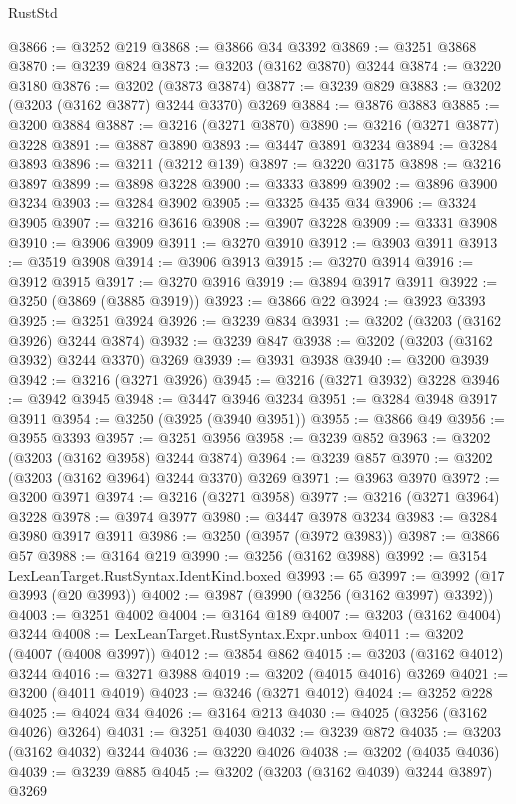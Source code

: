 \begin{lexlean}{RustStd}
\begin{coremodule}
@3866 := @3252 @219
@3868 := @3866 @34 @3392
@3869 := @3251 @3868
@3870 := @3239 @824
@3873 := @3203 (@3162 @3870) @3244
@3874 := @3220 @3180
@3876 := @3202 (@3873 @3874)
@3877 := @3239 @829
@3883 := @3202 (@3203 (@3162 @3877) @3244 @3370) @3269
@3884 := @3876 @3883
@3885 := @3200 @3884
@3887 := @3216 (@3271 @3870)
@3890 := @3216 (@3271 @3877) @3228
@3891 := @3887 @3890
@3893 := @3447 @3891 @3234
@3894 := @3284 @3893
@3896 := @3211 (@3212 @139)
@3897 := @3220 @3175
@3898 := @3216 @3897
@3899 := @3898 @3228
@3900 := @3333 @3899
@3902 := @3896 @3900 @3234
@3903 := @3284 @3902
@3905 := @3325 @435 @34
@3906 := @3324 @3905
@3907 := @3216 @3616
@3908 := @3907 @3228
@3909 := @3331 @3908
@3910 := @3906 @3909
@3911 := @3270 @3910
@3912 := @3903 @3911
@3913 := @3519 @3908
@3914 := @3906 @3913
@3915 := @3270 @3914
@3916 := @3912 @3915
@3917 := @3270 @3916
@3919 := @3894 @3917 @3911
@3922 := @3250 (@3869 (@3885 @3919))
@3923 := @3866 @22
@3924 := @3923 @3393
@3925 := @3251 @3924
@3926 := @3239 @834
@3931 := @3202 (@3203 (@3162 @3926) @3244 @3874)
@3932 := @3239 @847
@3938 := @3202 (@3203 (@3162 @3932) @3244 @3370) @3269
@3939 := @3931 @3938
@3940 := @3200 @3939
@3942 := @3216 (@3271 @3926)
@3945 := @3216 (@3271 @3932) @3228
@3946 := @3942 @3945
@3948 := @3447 @3946 @3234
@3951 := @3284 @3948 @3917 @3911
@3954 := @3250 (@3925 (@3940 @3951))
@3955 := @3866 @49
@3956 := @3955 @3393
@3957 := @3251 @3956
@3958 := @3239 @852
@3963 := @3202 (@3203 (@3162 @3958) @3244 @3874)
@3964 := @3239 @857
@3970 := @3202 (@3203 (@3162 @3964) @3244 @3370) @3269
@3971 := @3963 @3970
@3972 := @3200 @3971
@3974 := @3216 (@3271 @3958)
@3977 := @3216 (@3271 @3964) @3228
@3978 := @3974 @3977
@3980 := @3447 @3978 @3234
@3983 := @3284 @3980 @3917 @3911
@3986 := @3250 (@3957 (@3972 @3983))
@3987 := @3866 @57
@3988 := @3164 @219
@3990 := @3256 (@3162 @3988)
@3992 := @3154 LexLeanTarget.RustSyntax.IdentKind.boxed
@3993 := 65
@3997 := @3992 (@17 @3993 (@20 @3993))
@4002 := @3987 (@3990 (@3256 (@3162 @3997) @3392))
@4003 := @3251 @4002
@4004 := @3164 @189
@4007 := @3203 (@3162 @4004) @3244
@4008 := LexLeanTarget.RustSyntax.Expr.unbox
@4011 := @3202 (@4007 (@4008 @3997))
@4012 := @3854 @862
@4015 := @3203 (@3162 @4012) @3244
@4016 := @3271 @3988
@4019 := @3202 (@4015 @4016) @3269
@4021 := @3200 (@4011 @4019)
@4023 := @3246 (@3271 @4012)
@4024 := @3252 @228
@4025 := @4024 @34
@4026 := @3164 @213
@4030 := @4025 (@3256 (@3162 @4026) @3264)
@4031 := @3251 @4030
@4032 := @3239 @872
@4035 := @3203 (@3162 @4032) @3244
@4036 := @3220 @4026
@4038 := @3202 (@4035 @4036)
@4039 := @3239 @885
@4045 := @3202 (@3203 (@3162 @4039) @3244 @3897) @3269

\end{coremodule}
\end{lexlean}
